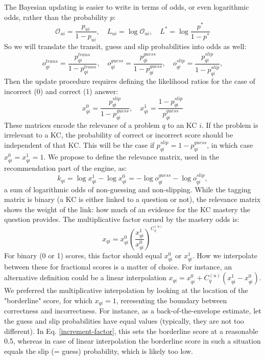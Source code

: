 \documentclass{sigchi}
\newcommand{\1}{\mathbf{1}}
\newcommand{\be}{\begin{equation}}
\newcommand{\ee}{\end{equation}}
\begin{document}
The Bayesian updating is easier to write in terms of odds, or even logarithmic odds, rather than the probability $p$: 
\be \mathcal{O}_{ui}=\frac{p_{ui}}{1-p_{ui}},\quad L_{ui}=\log\mathcal{O}_{ui},\quad L^*=\log\frac{p^*}{1-p^*}\label{odds-definition} \ee
So we will translate the transit, guess and slip probabilities into odds as well:
\be o_{qi}^{trans}=\frac{p_{qi}^{trans}}{1-p_{qi}^{trans}},\quad o_{qi}^{guess}=\frac{p_{qi}^{guess}}{1-p_{qi}^{guess}},\quad o_{qi}^{slip}=\frac{p_{qi}^{slip}}{1-p_{qi}^{slip}},\label{odds-params}\ee
Then the update procedure requires defining the likelihood ratios for the case of incorrect (0) and correct (1) answer:
\be x^0_{qi}=\frac{p_{qi}^{slip}}{1-p_{qi}^{guess}},\quad x^1_{qi}=\frac{1-p_{qi}^{slip}}{p_{qi}^{guess}}\label{discrimination}\ee
These matrices encode the relevance of a problem $q$ to an KC $i$. If the problem is irrelevant to a KC, the probability of correct or incorrect score should be independent of that KC. This will be the case if $p_{qi}^{slip}=1-p_{qi}^{guess}$, in which case $x^0_{qi}=x^1_{qi}=1$. We propose to define the relevance matrix, used in the recommendation part of the engine, as:
\be k_{qi}=\log x^1_{qi}-\log x^0_{qi}=-\log o_{qi}^{guess}-\log o_{qi}^{slip}\label{relevance},\ee
a sum of logarithmic odds of non-guessing and non-slipping. While the tagging matrix is binary (a KC is either linked to a question or not), the relevance matrix shows the weight of the link: how much of an evidence for the KC mastery the question provides. The multiplicative factor earned by the mastery odds is:
\be x_{qi}=x^0_{qi}\left(\frac{x^1_{qi}}{x^0_{qi}}\right)^{C_q^{(u)}}\label{increment-factor}\ee
For binary (0 or 1) scores, this factor should equal $x^0_{qi}$ or $x^1_{qi}$. How we interpolate between these for fractional scores is a matter of choice. For instance, an alternative definition could be a linear interpolation $x_{qi}=x^0_{qi}+C_q^{(u)}(x^1_{qi}-x^0_{qi})$. We preferred the multiplicative interpolation by looking at the location of the "borderline" score, for which $x_{qi}=1$, reresenting the boundary between correctness and incorrectness. For instance, as a back-of-the-envelope estimate, let the guess and slip probabilities have equal values (typically, they are not too different). In Eq. \ref{increment-factor}, this sets the borderline score at a reasonable 0.5, whereas in case of linear interpolation the borderline score in such a situation equals the slip (= guess) probability, which is likely too low.
\end{document}
